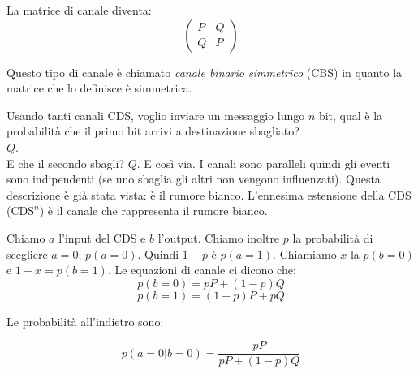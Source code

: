 La matrice di canale diventa:
\begin{equation*}
\begin{pmatrix}
P & Q\\
Q & P 
\end{pmatrix}
\end{equation*}

Questo tipo di canale è chiamato \textit{canale binario simmetrico} (CBS) in quanto la matrice che lo definisce è simmetrica.

Usando tanti canali CDS, voglio inviare un messaggio lungo $n$ bit, qual è la probabilità che il primo bit arrivi a destinazione sbagliato?\\
$Q$.\\
E che il secondo sbagli? $Q$. E così via.
I canali sono paralleli quindi gli eventi sono indipendenti (se uno sbaglia gli altri non vengono influenzati).
Questa descrizione è già stata vista: è il rumore bianco.
L'ennesima estensione della CDS ($\text{CDS}^n$) è il canale che rappresenta il rumore bianco.

Chiamo $a$ l'input del CDS e $b$ l'output. Chiamo inoltre $p$ la probabilità di scegliere $a=0$; $p(a=0)$.
Quindi $1-p$ è $p(a=1)$.
Chiamiamo $x$ la $p(b=0)$ e $1-x = p(b=1)$.
Le equazioni di canale ci dicono che:
\begin{equation*}
p(b=0) = pP + (1-p)Q
\end{equation*}
\begin{equation*}
p(b=1) = (1-p)P + pQ
\end{equation*}

Le probabilità all'indietro sono:

\begin{equation*}
p(a=0|b=0) = \frac{pP}{pP+(1-p)Q}
\end{equation*}


